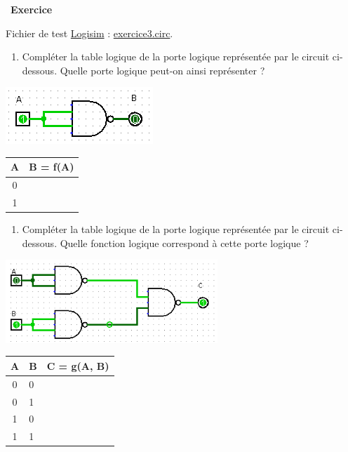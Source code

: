 \documentclass[
  11pt,
]{article}
\providecommand{\tightlist}{%
  \setlength{\itemsep}{0pt}\setlength{\parskip}{0pt}}
\newcounter{exo}
\newenvironment{exercice}[1]
{\par \medskip   \addtocounter{exo}{1} \noindent  
\begin{bclogo}[arrondi =0.1,   noborder = true, logo=\bccrayon, marge=4]{~\textbf{Exercice} \textbf{\theexo} {\itshape #1} }  \par}
{
\end{bclogo}
 \par \bigskip }
\newcounter{def}
\newcounter{logi}
\begin{document}
\begin{exercice}{}

Fichier de test \href{http://www.cburch.com/logisim/}{Logisim} :
\href{circuits_logisim/exercice3.circ}{exercice3.circ}.

\begin{enumerate}
\def\labelenumi{\arabic{enumi}.}
\tightlist
\item
  Compléter la table logique de la porte logique représentée par le
  circuit ci-dessous. Quelle porte logique peut-on ainsi représenter ?
\end{enumerate}

\includegraphics{images/porte_not_with_nand.png}\\

\begin{longtable}[]{@{}cl@{}}
\toprule
A & B = f(A)\tabularnewline
\midrule
\endhead
0 &\tabularnewline
1 &\tabularnewline
\bottomrule
\end{longtable}

\begin{enumerate}
\def\labelenumi{\arabic{enumi}.}
\setcounter{enumi}{1}
\tightlist
\item
  Compléter la table logique de la porte logique représentée par le
  circuit ci-dessous. Quelle fonction logique correspond à cette porte
  logique ?
\end{enumerate}

\includegraphics[width=0.6\textwidth,height=\textheight]{images/porte_or_with_nand.png}\\

\begin{longtable}[]{@{}cll@{}}
\toprule
A & B & C = g(A, B)\tabularnewline
\midrule
\endhead
0 & 0 &\tabularnewline
0 & 1 &\tabularnewline
1 & 0 &\tabularnewline
1 & 1 &\tabularnewline
\bottomrule
\end{longtable}

\end{exercice}
\end{document}
